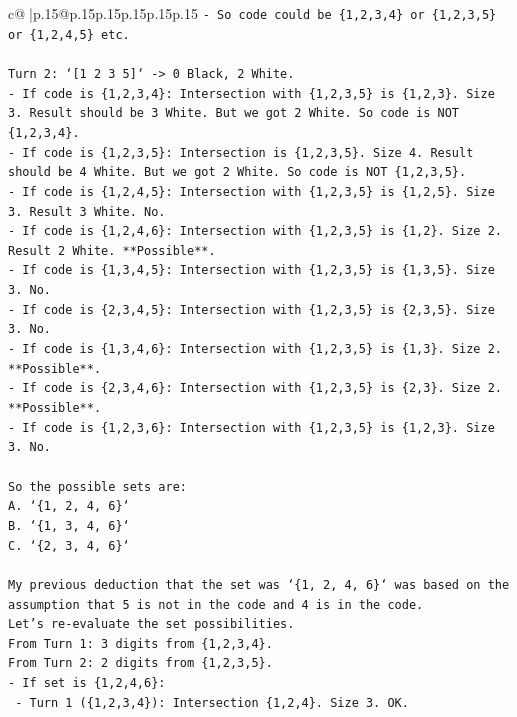 \documentclass{article}
\begin{document}
{\begin{supertabular}{c@{$\;$}|p{.15\linewidth}@{}p{.15\linewidth}p{.15\linewidth}p{.15\linewidth}p{.15\linewidth}p{.15\linewidth}}
{{{\texttt{{-} So code could be \{1,2,3,4\} or \{1,2,3,5\} or \{1,2,4,5\} etc.} \\
\\ 
\texttt{Turn 2: `{[}1 2 3 5{]}` {-}> 0 Black, 2 White.} \\
\texttt{{-} If code is \{1,2,3,4\}: Intersection with \{1,2,3,5\} is \{1,2,3\}. Size 3. Result should be 3 White. But we got 2 White. So code is NOT \{1,2,3,4\}.} \\
\texttt{{-} If code is \{1,2,3,5\}: Intersection is \{1,2,3,5\}. Size 4. Result should be 4 White. But we got 2 White. So code is NOT \{1,2,3,5\}.} \\
\texttt{{-} If code is \{1,2,4,5\}: Intersection with \{1,2,3,5\} is \{1,2,5\}. Size 3. Result 3 White. No.} \\
\texttt{{-} If code is \{1,2,4,6\}: Intersection with \{1,2,3,5\} is \{1,2\}. Size 2. Result 2 White. **Possible**.} \\
\texttt{{-} If code is \{1,3,4,5\}: Intersection with \{1,2,3,5\} is \{1,3,5\}. Size 3. No.} \\
\texttt{{-} If code is \{2,3,4,5\}: Intersection with \{1,2,3,5\} is \{2,3,5\}. Size 3. No.} \\
\texttt{{-} If code is \{1,3,4,6\}: Intersection with \{1,2,3,5\} is \{1,3\}. Size 2. **Possible**.} \\
\texttt{{-} If code is \{2,3,4,6\}: Intersection with \{1,2,3,5\} is \{2,3\}. Size 2. **Possible**.} \\
\texttt{{-} If code is \{1,2,3,6\}: Intersection with \{1,2,3,5\} is \{1,2,3\}. Size 3. No.} \\
\\ 
\texttt{So the possible sets are:} \\
\texttt{A. `\{1, 2, 4, 6\}`} \\
\texttt{B. `\{1, 3, 4, 6\}`} \\
\texttt{C. `\{2, 3, 4, 6\}`} \\
\\ 
\texttt{My previous deduction that the set was `\{1, 2, 4, 6\}` was based on the assumption that 5 is not in the code and 4 is in the code.} \\
\texttt{Let's re{-}evaluate the set possibilities.} \\
\texttt{From Turn 1: 3 digits from \{1,2,3,4\}.} \\
\texttt{From Turn 2: 2 digits from \{1,2,3,5\}.} \\
\texttt{{-} If set is \{1,2,4,6\}:} \\
\texttt{  {-} Turn 1 (\{1,2,3,4\}): Intersection \{1,2,4\}. Size 3. OK.} \\
}}}
\end{supertabular}}
\end{document}
